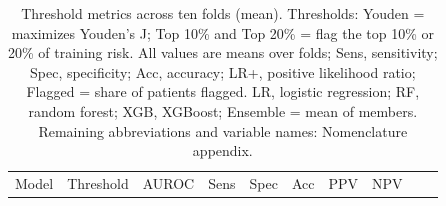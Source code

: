 \documentclass[
  11pt,
]{article}
\begin{document}
\begin{longtable}[]{@{}
  >{\raggedright\arraybackslash}p{}
  >{\raggedright\arraybackslash}p{}
  >{\raggedright\arraybackslash}p{}
  >{\raggedright\arraybackslash}p{}
  >{\raggedright\arraybackslash}p{}
  >{\raggedright\arraybackslash}p{}
  >{\raggedright\arraybackslash}p{}
  >{\raggedright\arraybackslash}p{}
  >{\raggedright\arraybackslash}p{}
  >{\raggedright\arraybackslash}p{}@{}}
\caption{Threshold metrics across ten folds (mean). Thresholds: Youden =
maximizes Youden's J; Top 10\% and Top 20\% = flag the top 10\% or 20\%
of training risk. All values are means over folds; Sens, sensitivity;
Spec, specificity; Acc, accuracy; LR+, positive likelihood ratio;
Flagged = share of patients flagged. LR, logistic regression; RF, random
forest; XGB, XGBoost; Ensemble = mean of members. Remaining
abbreviations and variable names: Nomenclature appendix.}\tabularnewline
\toprule\noalign{}
\begin{minipage}[b]{\linewidth}\raggedright
Model
\end{minipage} & \begin{minipage}[b]{\linewidth}\raggedright
Threshold
\end{minipage} & \begin{minipage}[b]{\linewidth}\raggedright
AUROC
\end{minipage} & \begin{minipage}[b]{\linewidth}\raggedright
Sens
\end{minipage} & \begin{minipage}[b]{\linewidth}\raggedright
Spec
\end{minipage} & \begin{minipage}[b]{\linewidth}\raggedright
Acc
\end{minipage} & \begin{minipage}[b]{\linewidth}\raggedright
PPV
\end{minipage} & \begin{minipage}[b]{\linewidth}\raggedright
NPV
\end{minipage} & \begin{minipage}[b]{\linewidth}\raggedright

\end{minipage}
\end{longtable}
\end{document}
